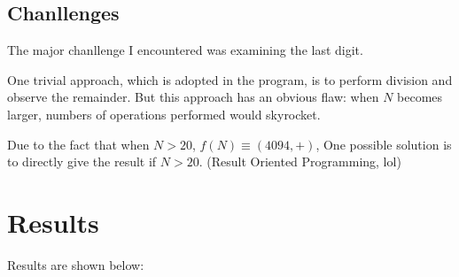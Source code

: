 \documentclass[UTF8]{ctexart}
\begin{document}
\subsection{Chanllenges}
The major chanllenge I encountered was examining the last digit.

One trivial approach, which is adopted in the program, is to perform division and observe the remainder. 
But this approach has an obvious flaw: when $N$ becomes larger, numbers of operations performed would skyrocket.

Due to the fact that when $N>20$, $f(N)\equiv (4094, +)$, One possible solution is to directly give the result
if $N>20$. (Result Oriented Programming, lol)

\section{Results}
Results are shown below:
\end{document}
